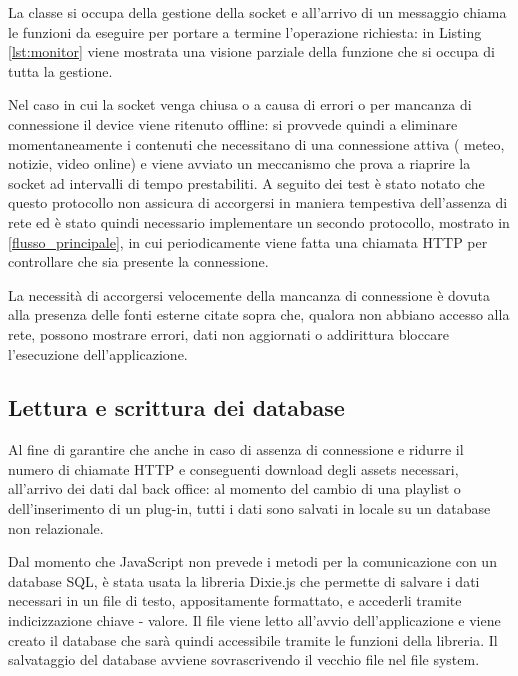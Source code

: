 La classe  si occupa della gestione della socket e all'arrivo di un messaggio chiama le funzioni da eseguire per portare a termine l'operazione richiesta: in Listing \ref*{lst:monitor} viene mostrata una visione parziale della funzione  che si occupa di tutta la gestione.



Nel caso in cui la socket venga chiusa o a causa di errori o per mancanza di connessione il device viene ritenuto offline: si provvede quindi a eliminare momentaneamente i contenuti che necessitano di una connessione attiva ( meteo, notizie, video online) e viene avviato un meccanismo che prova a riaprire la socket ad intervalli di tempo prestabiliti.
A seguito dei test è stato notato che questo protocollo non assicura di accorgersi in maniera tempestiva dell'assenza di rete ed è stato quindi necessario implementare un secondo protocollo, mostrato in \ref*{flusso_principale}, in cui periodicamente viene fatta una chiamata HTTP per controllare che sia presente la connessione.

La necessità di accorgersi velocemente della mancanza di connessione è dovuta alla presenza delle fonti esterne citate sopra che, qualora non abbiano accesso alla rete, possono mostrare errori, dati non aggiornati o addirittura bloccare l'esecuzione dell'applicazione.

\subsection{Lettura e scrittura dei database} \label{database}

Al fine di garantire che anche in caso di assenza di connessione e ridurre il numero di chiamate HTTP e conseguenti download degli assets necessari, all'arrivo dei dati dal back office: al momento del cambio di una playlist o dell'inserimento di un plug-in, tutti i dati sono salvati in locale su un database non relazionale.

Dal momento che JavaScript non prevede i metodi per la comunicazione con un database SQL, è stata usata la libreria Dixie.js \cite{dixie} che permette di salvare i dati necessari in un file di testo, appositamente formattato, e accederli tramite indicizzazione chiave - valore. Il file viene letto all'avvio dell'applicazione e viene creato il database che sarà quindi accessibile tramite le funzioni della libreria. Il salvataggio del database avviene sovrascrivendo il vecchio file nel file system.

